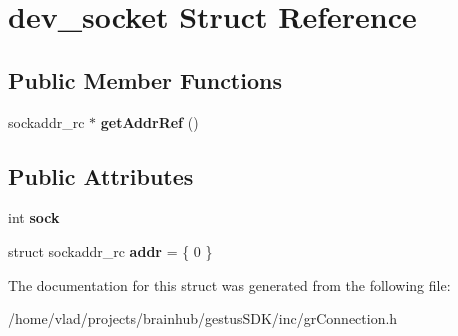 \hypertarget{structdev__socket}{}\section{dev\+\_\+socket Struct Reference}
\label{structdev__socket}
\subsection*{Public Member Functions}
\begin{DoxyCompactItemize}
\item 
\mbox{\label{structdev__socket_ad1876873738658ed76347fde5f70c1eb}} 
sockaddr\+\_\+rc $\ast$ {\bfseries get\+Addr\+Ref} ()
\end{DoxyCompactItemize}
\subsection*{Public Attributes}
\begin{DoxyCompactItemize}
\item 
\mbox{\label{structdev__socket_a8bc6d848be0a9f4ec7d7639ac66eb932}} 
int {\bfseries sock}
\item 
\mbox{\label{structdev__socket_aa49a0dec9aebbdff2482f5bfb81b2b52}} 
struct sockaddr\+\_\+rc {\bfseries addr} = \{ 0 \}
\end{DoxyCompactItemize}


The documentation for this struct was generated from the following file\+:\begin{DoxyCompactItemize}
\item 
/home/vlad/projects/brainhub/gestus\+S\+D\+K/inc/gr\+Connection.\+h\end{DoxyCompactItemize}
